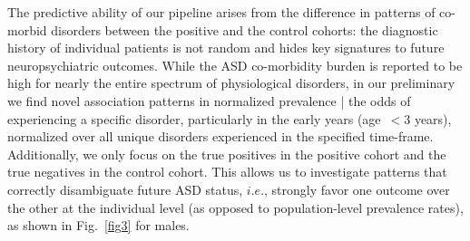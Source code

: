 \documentclass[onecolumn, compsoc,11pt]{IEEEtran}
\makeatletter
\renewcommand\subsection{\@startsection {subsection}{2}{\z@}%
                                   {0ex \@plus -1.75ex \@minus -1.2ex}%
                                   {0ex \@plus.0ex}%
                                   {\fontsize{11}{11}\selectfont\bfseries\sffamily\color{black}}}
\def\treatment{positive\xspace}
\makeatother
\begin{document}
The predictive ability of our pipeline arises from the difference in patterns of co-morbid disorders between the \treatment and the control cohorts: the diagnostic history of individual patients is not random and hides key signatures to future neuropsychiatric outcomes. %
%
While the ASD co-morbidity burden  is reported to be high for nearly the entire spectrum of  physiological disorders, in our preliminary we find novel association patterns in normalized prevalence | the odds of experiencing a specific disorder, particularly in the early years (age~$<3$ years), normalized over all unique disorders experienced in the specified time-frame. Additionally, we only focus on  the true positives in the \treatment cohort and the true negatives in the control cohort. This  allows us to investigate  patterns that correctly disambiguate future ASD status, $i.e.$, strongly favor one outcome over the other at the individual level (as opposed to population-level prevalence rates), as shown in  Fig.~\ref{fig3} for males.

%
%
\end{document}
